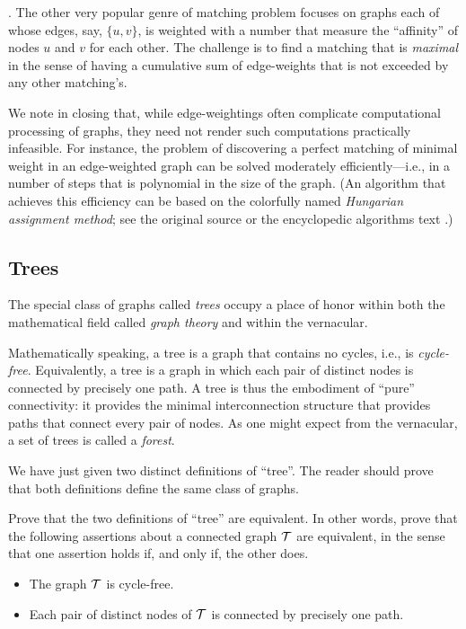.
The other very popular genre of matching problem focuses on graphs
each of whose edges, say, $\{u,v\}$, is weighted with a number that
measure the ``affinity'' of  nodes $u$ and $v$ for each other.  The
challenge is to find a matching that is {\em maximal}
 in the sense of having a cumulative
sum of edge-weights that is not exceeded by any other matching's.

We note in closing that, while edge-weightings often complicate
computational processing of graphs, they need not render such
computations practically infeasible.  For instance, the problem of
discovering a perfect matching of minimal weight in an edge-weighted
graph can be solved moderately efficiently---i.e., in a number of
steps that is polynomial in the size of the graph.  (An algorithm that
achieves this efficiency can be based on the colorfully named {\it
  Hungarian assignment method};   see the
original source \cite{Kuhn55} or the encyclopedic algorithms text
\cite{CLRS}.)

\subsection{Trees}
\label{sec:Trees}

The special class of graphs called {\it trees} 
 occupy a place of honor within both the mathematical
field called {\it graph theory} and within the vernacular.

Mathematically speaking, a tree is a graph that contains no cycles,
i.e., is {\it cycle-free}.  Equivalently, a
tree is a graph in which each pair of distinct nodes is connected by
precisely one path.  A tree is thus the embodiment of ``pure''
connectivity: it provides the minimal interconnection structure that
provides paths that connect every pair of nodes.  As one might expect
from the vernacular, a set of trees is called a {\it
  forest}. 

We have just given two distinct definitions of ``tree''.  The reader
should prove that both definitions define the same class of graphs.

\begin{prop}
\label{thm:2defns-trees}
Prove that the two definitions of ``tree'' are equivalent.  In other
words, prove that the following assertions about a connected graph
$\mbox{$\cal T$}$ are equivalent, in the sense that one assertion holds if, and
only if, the other does.
\begin{itemize}
\item
The graph $\mbox{$\cal T$}$ is cycle-free.
\item
Each pair of distinct nodes of $\mbox{$\cal T$}$ is connected by precisely one
path.
\end{itemize}
\end{prop}

